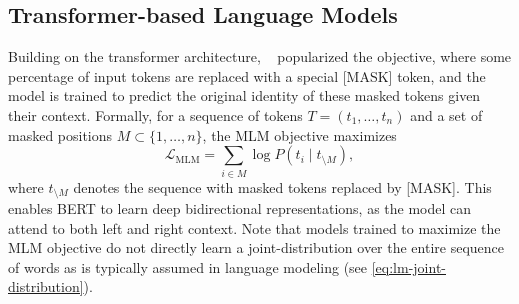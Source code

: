 

\subsection{Transformer-based Language Models}

Building on the transformer architecture, ~\citep{devlin2019bert} popularized the  objective, where some percentage of input tokens are replaced with a special [MASK] token, and the model is trained to predict the original identity of these masked tokens given their context. Formally, for a sequence of tokens $T = (t_1, \ldots, t_n)$ and a set of masked positions $M \subset \{1, \ldots, n\}$, the MLM objective maximizes
\begin{equation}
    \mathcal{L}_{\text{MLM}} = \sum_{i \in M} \log P(t_i \mid t_{\setminus M}),
\end{equation}
where $t_{\setminus M}$ denotes the sequence with masked tokens replaced by [MASK]. This enables BERT to learn deep bidirectional representations, as the model can attend to both left and right context. Note that models trained to maximize the MLM objective do not directly learn a joint-distribution over the entire sequence of words as is typically assumed in language modeling (see \cref{eq:lm-joint-distribution}).

